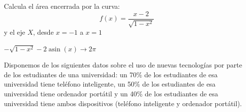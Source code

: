\documentclass[addpoints,spanish, 12pt,a4paper]{exam}
\begin{document}
\begin{questions}
\question[4] Calcula el área encerrada por la curva: $$f(x)=\dfrac{x-2}{\sqrt{1-x^2}}$$ y el eje $X$, desde $x=-1$ a $x=1$
\begin{solution}
    $- \sqrt{1 - x^{2}} - 2 \operatorname{asin}{\left(x \right)} \to 2\pi$    
\end{solution}




\question[3] Disponemos de los siguientes datos sobre el uso de nuevas tecnologías por parte de los estudiantes de una universidad: un 70\% de los estudiantes de esa universidad tiene teléfono inteligente, un 50\% de los estudiantes de esa universidad tiene ordenador portátil y un 40\% de los estudiantes de esa universidad tiene ambos dispositivos (teléfono inteligente y ordenador portátil).
\end{questions}
\end{document}
